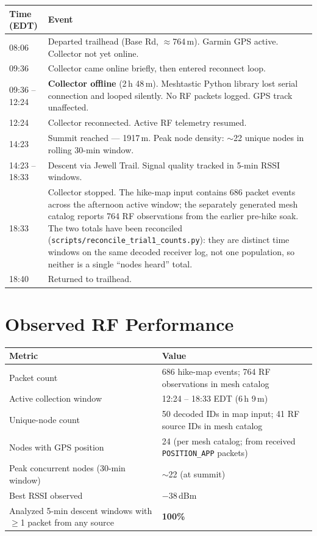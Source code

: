 \documentclass[11pt,letterpaper]{article}
\begin{document}
\begin{center}
\begin{tabular}{@{}lp{10.5cm}@{}}
\toprule
\textbf{Time (EDT)} & \textbf{Event} \\
\midrule
08:06 & Departed trailhead (Base Rd, $\approx$764\,m). Garmin GPS active. Collector not yet online. \\
09:36 & Collector came online briefly, then entered reconnect loop. \\
\textcolor{issured}{09:36 -- 12:24} & \textcolor{issured}{\textbf{Collector offline} (2\,h 48\,m). Meshtastic Python library lost serial connection and looped silently. No RF packets logged. GPS track unaffected.} \\
12:24 & Collector reconnected. Active RF telemetry resumed. \\
14:23 & Summit reached --- 1917\,m. Peak node density: $\sim$22 unique nodes in rolling 30-min window. \\
14:23 -- 18:33 & Descent via Jewell Trail. Signal quality tracked in 5-min RSSI windows. \\
18:33 & Collector stopped. The hike-map input contains 686 packet events across the
afternoon active window; the separately generated mesh catalog reports 764 RF
observations from the earlier pre-hike soak. The two totals have been reconciled
(\texttt{scripts/reconcile\_trial1\_counts.py}): they are distinct time windows on the
same decoded receiver log, not one population, so neither is a single ``nodes heard'' total. \\
18:40 & Returned to trailhead. \\
\bottomrule
\end{tabular}
\end{center}

\section{Observed RF Performance}

\begin{center}
\begin{tabular}{@{}lp{9.2cm}@{}}
\toprule
\textbf{Metric} & \textbf{Value} \\
\midrule
Packet count                  & 686 hike-map events; 764 RF observations in mesh catalog \\
Active collection window      & 12:24 -- 18:33 EDT (6\,h 9\,m) \\
Unique-node count             & 50 decoded IDs in map input; 41 RF source IDs in mesh catalog \\
Nodes with GPS position       & 24 (per mesh catalog; from received \texttt{POSITION\_APP} packets) \\
Peak concurrent nodes (30-min window) & $\sim$22 (at summit) \\
Best RSSI observed            & $-38$\,dBm \\
Analyzed 5-min descent windows with $\geq$1 packet from any source & \textcolor{okgreen}{\textbf{100\%}} \\
\bottomrule
\end{tabular}
\end{center}
\end{document}
